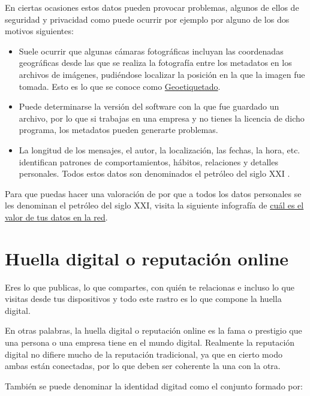 \documentclass[
  a4paper,
  openany]{book}
\begin{document}
En ciertas ocasiones estos datos pueden provocar problemas, algunos de ellos de seguridad y privacidad como puede ocurrir por ejemplo por alguno de los dos motivos siguientes:

\begin{itemize}
\item
  Suele ocurrir que algunas cámaras fotográficas incluyan las coordenadas geográficas desde las que se realiza la fotografía entre los metadatos en los archivos de imágenes, pudiéndose localizar la posición en la que la imagen fue tomada. Esto es lo que se conoce como \href{https://es.wikipedia.org/wiki/Geoetiquetado}{Geoetiquetado}.
\item
  Puede determinarse la versión del software con la que fue guardado un archivo, por lo que si trabajas en una empresa y no tienes la licencia de dicho programa, los metadatos pueden generarte problemas.
\item
  La longitud de los mensajes, el autor, la localización, las fechas, la hora, etc. identifican patrones de comportamientos, hábitos, relaciones y detalles personales. Todos estos datos son denominados el petróleo del siglo XXI \citep{OSI-petroleo-S-XXI}.
\end{itemize}

Para que puedas hacer una valoración de por que a todos los datos personales se les denominan el petróleo del siglo XXI, visita la siguiente infografía de \href{https://www.osi.es/sites/default/files/images/concienciacion/c15-pdf-infografia-ciberdelincuentes_reyes.pdf}{cuál es el valor de tus datos en la red}.

\hypertarget{huella-digital-o-reputaciuxf3n-online}{%
\section{Huella digital o reputación online}\label{huella-digital-o-reputaciuxf3n-online}}

Eres lo que publicas, lo que compartes, con quién te relacionas e incluso lo que visitas desde tus dispositivos y todo este rastro es lo que compone la huella digital.

En otras palabras, la huella digital o reputación online es la fama o prestigio que una persona o una empresa tiene en el mundo digital. Realmente la reputación digital no difiere mucho de la reputación tradicional, ya que en cierto modo ambas están conectadas, por lo que deben ser coherente la una con la otra.

También se puede denominar la identidad digitad como el conjunto formado por:
\end{document}

